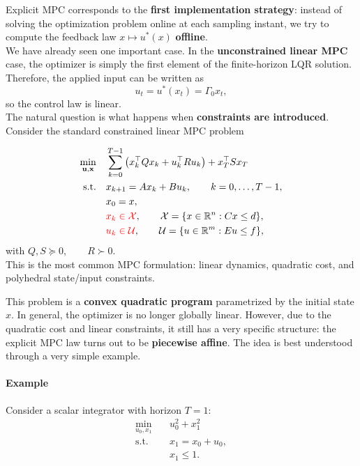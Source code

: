 Explicit MPC corresponds to the \textbf{first implementation strategy}: instead of solving the optimization problem online at each sampling instant, we try to compute the feedback law $ x \mapsto u^*(x) $ \textbf{offline}.\\
We have already seen one important case. In the \textbf{unconstrained linear MPC} case, the optimizer is simply the first element of the finite-horizon LQR solution. Therefore, the applied input can be written as
\[
u_t = u^*(x_t)=\Gamma_0 x_t,
\]
so the control law is linear.\\
The natural question is what happens when \textbf{constraints are introduced}. Consider the standard constrained linear MPC problem
\begin{theorembox}
\begin{align*}
\min_{\mathbf{u},\mathbf{x}} \quad &
\sum_{k=0}^{T-1}\left(x_k^\top Q x_k + u_k^\top R u_k\right) + x_T^\top S x_T \\
\text{s.t.}\quad
& x_{k+1}=Ax_k+Bu_k, \qquad k=0,\dots,T-1, \\
& x_0=x, \\
& \textcolor{red}{x_k \in \mathcal{X}}, \qquad \mathcal{X}=\{x \in \mathbb{R}^n : Cx \le d\}, \\
& \textcolor{red}{u_k \in \mathcal{U}}, \qquad \mathcal{U}=\{u \in \mathbb{R}^m : Eu \le f\},
\end{align*}
with $ Q,S \succeq 0, \qquad R \succ 0 $.\\
This is the most common MPC formulation: linear dynamics, quadratic cost, and polyhedral state/input constraints.
\end{theorembox}
This problem is a \textbf{convex quadratic program} parametrized by the initial state $x$. In general, the optimizer is no longer globally linear. However, due to the quadratic cost and linear constraints, it still has a very specific structure: the explicit MPC law turns out to be \textbf{piecewise affine}. The idea is best understood through a very simple example.

\paragraph{Example}
Consider a scalar integrator with horizon $T=1$:
\begin{align*}
\min_{u_0,x_1} \quad & u_0^2 + x_1^2 \\
\text{s.t.}\quad & x_1 = x_0 + u_0, \\
& x_1 \le 1.
\end{align*}


